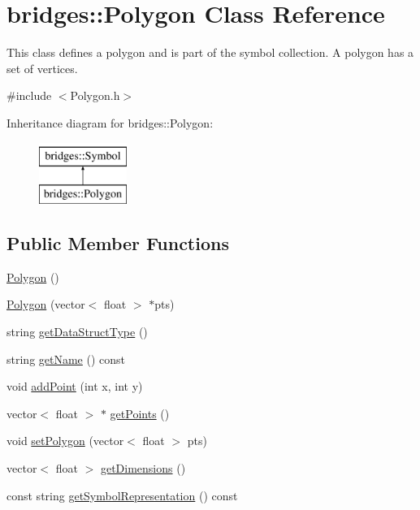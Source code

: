 \hypertarget{classbridges_1_1_polygon}{}\section{bridges\+:\+:Polygon Class Reference}
\label{classbridges_1_1_polygon}


This class defines a polygon and is part of the symbol collection. A polygon has a set of vertices.  




{\ttfamily \#include $<$Polygon.\+h$>$}

Inheritance diagram for bridges\+:\+:Polygon\+:\begin{figure}[H]
\begin{center}
\leavevmode
\includegraphics[height=2.000000cm]{classbridges_1_1_polygon}
\end{center}
\end{figure}
\subsection*{Public Member Functions}
\begin{DoxyCompactItemize}
\item 
\mbox{\hyperlink{classbridges_1_1_polygon_ade0fbaaa5a1b638ec6faec52ee6950f3}{Polygon}} ()
\item 
\mbox{\hyperlink{classbridges_1_1_polygon_acd99b72ad6c6d0ecc9cdc7a19b5bbcaf}{Polygon}} (vector$<$ float $>$ $\ast$pts)
\item 
string \mbox{\hyperlink{classbridges_1_1_polygon_a6b6d16de65c74f1e2e4e8f0ff4056451}{get\+Data\+Struct\+Type}} ()
\item 
string \mbox{\hyperlink{classbridges_1_1_polygon_af376b1e7ab19ae90e7de9ba1f717753b}{get\+Name}} () const
\item 
void \mbox{\hyperlink{classbridges_1_1_polygon_ad38f9d5431e4a2dc9f5ed633e118c95c}{add\+Point}} (int x, int y)
\item 
vector$<$ float $>$ $\ast$ \mbox{\hyperlink{classbridges_1_1_polygon_aa4006759697d4428074747686cf231f9}{get\+Points}} ()
\item 
void \mbox{\hyperlink{classbridges_1_1_polygon_a43ffa2f8767318c9c831dad9ed030679}{set\+Polygon}} (vector$<$ float $>$ pts)
\item 
vector$<$ float $>$ \mbox{\hyperlink{classbridges_1_1_polygon_a6ad07473cb57633eca62a3f6832ea08c}{get\+Dimensions}} ()
\item 
const string \mbox{\hyperlink{classbridges_1_1_polygon_a5c3e3bbeda23db712088278a3c82a0a6}{get\+Symbol\+Representation}} () const
\end{DoxyCompactItemize}
